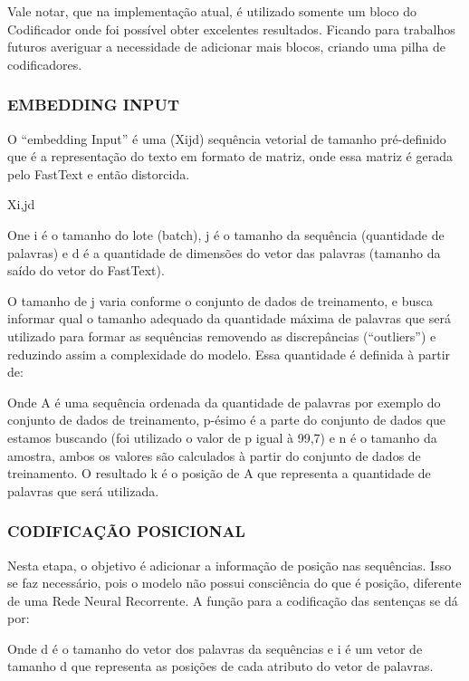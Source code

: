Vale notar, que na implementação atual, é utilizado somente um bloco do Codificador onde foi possível obter excelentes resultados. Ficando para trabalhos futuros averiguar a necessidade de adicionar mais blocos, criando uma pilha de codificadores.

\subsubsection{EMBEDDING INPUT}

O “embedding Input” é uma (Xijd) sequência vetorial de tamanho pré-definido que é a representação do texto em formato de matriz, onde essa matriz é gerada pelo FastText e então distorcida.

Xi,jd

One i é o tamanho do lote (batch), j é o tamanho da sequência (quantidade de palavras) e d é a quantidade de dimensões do vetor das palavras (tamanho da saído do vetor do FastText). 

O tamanho de j varia conforme o conjunto de dados de treinamento, e busca informar qual o tamanho adequado da quantidade máxima de palavras que será utilizado para formar as sequências removendo as discrepâncias (“outliers”) e reduzindo assim a complexidade do modelo. Essa quantidade é definida à partir de:


Onde A é uma sequência ordenada da quantidade de palavras por exemplo do conjunto de dados de treinamento,  p-ésimo é a parte  do conjunto de dados que estamos buscando (foi utilizado o valor de p igual à 99,7) e n é o tamanho da amostra, ambos os valores são calculados à partir do conjunto de dados de treinamento. O resultado k é o posição de A que representa a quantidade de palavras que será utilizada.

\subsubsection{CODIFICAÇÃO POSICIONAL}

Nesta etapa, o objetivo é adicionar a informação de posição nas sequências. Isso se faz necessário, pois o modelo não possui consciência do que é posição, diferente de uma Rede Neural Recorrente. A função para a codificação das sentenças se dá por:

Onde d é o tamanho do vetor dos palavras da sequências e i é um vetor de tamanho d que representa as posições de cada atributo do vetor de palavras.

